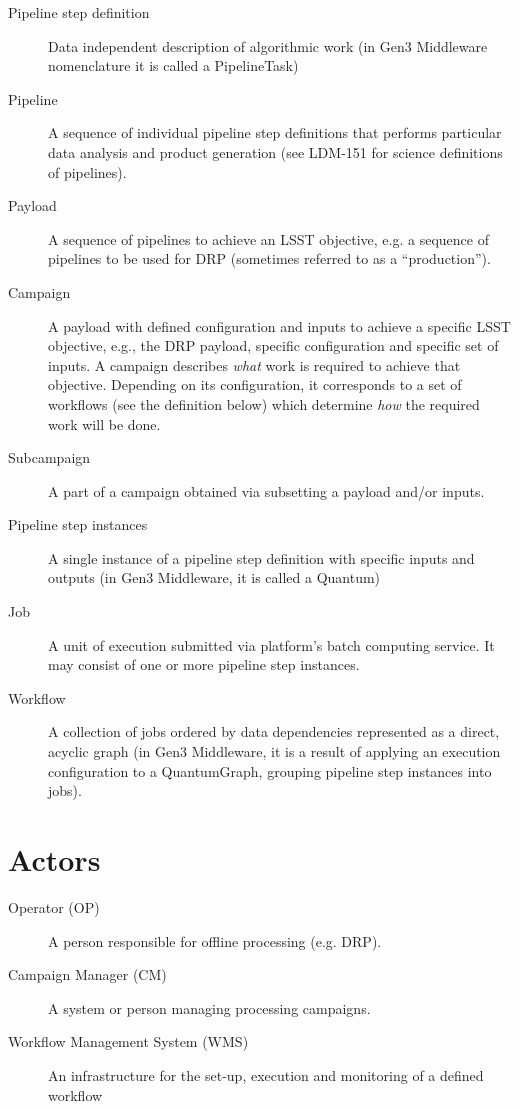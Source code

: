 \documentclass[DM,lsstdraft,toc]{lsstdoc}
\begin{document}
\begin{description}
  \item[Pipeline step definition]
    Data independent description of algorithmic work (in Gen3 Middleware
    nomenclature it is called a PipelineTask)
  \item[Pipeline] 
    A sequence of individual pipeline step definitions that performs particular
    data analysis and product generation (see LDM-151 for science definitions
    of pipelines).
  \item[Payload]
    A sequence of pipelines to achieve an LSST objective, e.g. a sequence of
    pipelines to be used for DRP (sometimes referred to as a ``production'').
  \item[Campaign]
    A payload with defined configuration and inputs to achieve a
    specific LSST objective, e.g., the DRP payload, specific
    configuration and specific set of inputs. A campaign describes
    \emph{what} work is required to achieve that objective.  Depending on
    its configuration, it corresponds to a set of workflows (see the
    definition below) which determine \emph{how} the required work will be
    done.
  \item[Subcampaign]
    A part of a campaign obtained via subsetting a payload and/or inputs.
  \item[Pipeline step instances]
    A single instance of a pipeline step definition with specific inputs and
    outputs (in Gen3 Middleware, it is called a Quantum)
  \item[Job]
    A unit of execution submitted via platform's batch computing
    service. It may consist of one or more pipeline step instances.
  \item[Workflow]
    A collection of jobs ordered by data dependencies represented as a direct,
    acyclic graph (in Gen3 Middleware, it is a result of applying an execution
    configuration to a QuantumGraph, grouping pipeline step instances into
    jobs).
\end{description}

\section{Actors}

\begin{description}
  \item[Operator (OP)]
    A person responsible for offline processing (e.g. DRP). 
  \item[Campaign Manager (CM)]
    A system or person managing processing campaigns.
  \item[Workflow Management System (WMS)]
    An infrastructure for the set-up, execution and monitoring of a defined
    workflow
\end{description}
\end{document}
